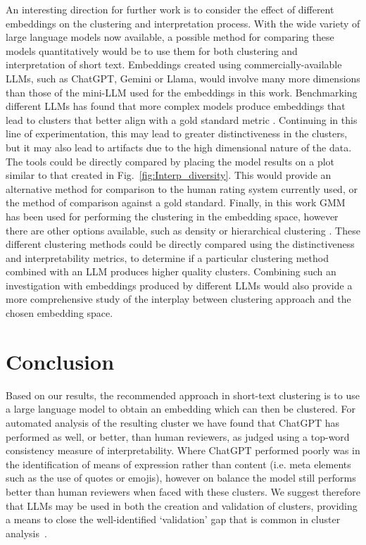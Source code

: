 \documentclass{article}
\begin{document}
An interesting direction for further work is to consider the effect of different embeddings on the clustering and interpretation process.  With the wide variety of large language models now available, a possible method for comparing these models quantitatively would be to use them for both clustering and interpretation of short text.  Embeddings created using commercially-available LLMs, such as ChatGPT, Gemini or Llama, would involve many more dimensions than those of the mini-LLM used for the embeddings in this work. Benchmarking different LLMs has found that more complex models produce embeddings that lead to clusters that better align with a gold standard metric \cite{keraghel2024beyond}.  Continuing in this line of experimentation, 
this may lead to greater distinctiveness in the clusters, but it may also lead to artifacts due to the high dimensional nature of the data.  The tools could be directly compared by placing the model results on a plot similar to that created in Fig.~\ref{fig:Interp_diversity}.  This would provide an alternative method for comparison to the human rating system currently used, or the method of comparison against a gold standard.  
Finally, in this work GMM has been used for performing the clustering in the embedding space, however there are other options available, such as density or hierarchical clustering \cite{10.1371/journal.pone.0210236}.  These different clustering methods could be directly compared using the distinctiveness and interpretability metrics, to determine if a particular clustering method combined with an LLM produces higher quality clusters.  Combining such an investigation with embeddings produced by different LLMs would also provide a more comprehensive study of the interplay between clustering approach and the chosen embedding space.

\section{Conclusion}
Based on our results, the recommended approach in short-text clustering is to use a large language model to obtain an embedding which can then be clustered.  For automated analysis of the resulting cluster we have found that ChatGPT has performed as well, or better, than human reviewers, as judged using a top-word consistency measure of interpretability.  Where ChatGPT performed poorly was in the identification of means of expression rather than content (i.e. meta elements such as the use of quotes or emojis), however on balance the model still performs better than human reviewers when faced with these clusters.  We suggest therefore that LLMs may be used in both the creation and validation of clusters, providing a means to close the well-identified `validation' gap that is common in cluster analysis~\cite{hoyle2021}.
\end{document}

